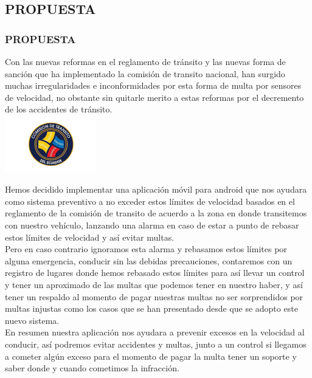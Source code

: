 \documentclass{beamer}						%
\begin{document}
	\begin{frame}[allowframebreaks]
		\section{PROPUESTA}
		\frametitle{PROPUESTA}
			\Large{
			Con  las nuevas reformas en el reglamento de tránsito y las nuevas forma de sanción que 
			ha implementado la comisión de transito nacional, han surgido muchas irregularidades e inconformidades
			por esta forma de multa por sensores de velocidad, no obstante sin quitarle merito a estas reformas por
			 el decremento de los accidentes de tránsito.\\
			 \includegraphics[width=4cm]{./images/logo-cte.jpg}

			 Hemos decidido implementar una aplicación móvil para android que nos ayudara como sistema preventivo a 
			no exceder estos límites de velocidad basados en el reglamento de la comisión de transito de acuerdo a 
			la zona en donde transitemos con nuestro vehículo,  lanzando una alarma en caso de estar a punto de rebasar estos límites de velocidad y así evitar multas.\\
			
			Pero en caso contrario ignoramos esta alarma y rebasamos estos límites por alguna emergencia, conducir sin 
			las debidas precauciones, contaremos con un registro de lugares donde hemos rebasado estos límites para así 
			llevar un control y tener un aproximado de las multas que podemos tener en nuestro haber, y así tener un 
			respaldo al momento de pagar nuestras multas no ser sorprendidos por multas injustas como los casos que se han 
			presentado desde que se adopto este nuevo sistema.\\
			
			En resumen nuestra aplicación nos ayudara a prevenir excesos en la velocidad al conducir, así podremos evitar
 			accidentes y multas, junto a un control si llegamos a cometer algún exceso para el momento de pagar la multa tener
 			un soporte y saber donde y cuando cometimos la infracción.}
			
	\end{frame}
\end{document}
